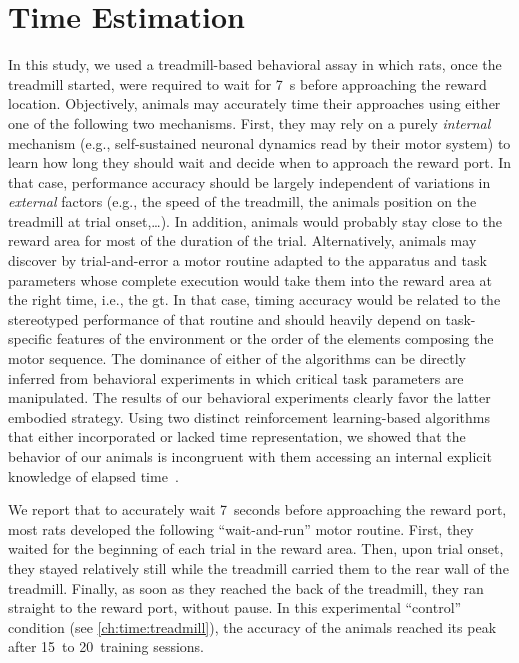 \section{Time Estimation}
\label{ch:disscusion:time}

In this study, we used a treadmill-based behavioral assay in which rats, once the treadmill started, were required to wait for 7~s before approaching the reward location.
Objectively, animals may accurately time their approaches using either one of the following two mechanisms.
First, they may rely on a purely \textit{internal} mechanism (e.g., self-sustained neuronal dynamics read by their motor system) to learn how long they should wait and decide when to approach the reward port.
In that case, performance accuracy should be largely independent of variations in \textit{external} factors (e.g., the speed of the treadmill, the animals position on the treadmill at trial onset,\ldots).
In addition, animals would probably stay close to the reward area for most of the duration of the trial.
Alternatively, animals may discover by trial-and-error a motor routine adapted to the apparatus and task parameters whose complete execution would take them into the reward area at the right time, i.e., the \gls{gt}.
In that case, timing accuracy would be related to the stereotyped performance of that routine and should heavily depend on task-specific features of the environment or the order of the elements composing the motor sequence.
The dominance of either of the algorithms can be directly inferred from behavioral experiments in which critical task parameters are manipulated.
The results of our behavioral experiments clearly favor the latter embodied strategy.
Using two distinct reinforcement learning-based algorithms that either incorporated or lacked time representation, we showed that the behavior of our animals is incongruent with them accessing an internal explicit knowledge of elapsed time~\cite{Safaie2020PNAS}.
\par
We report that to accurately wait 7~seconds before approaching the reward port, most rats developed the following ``wait-and-run'' motor routine.
First, they waited for the beginning of each trial in the reward area.
Then, upon trial onset, they stayed relatively still while the treadmill carried them to the rear wall of the treadmill.
Finally, as soon as they reached the back of the treadmill, they ran straight to the reward port, without pause.
In this experimental ``control'' condition (see \autoref{ch:time:treadmill}), the accuracy of the animals reached its peak after 15~to 20~training sessions.
